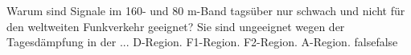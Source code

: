     {Warum sind Signale im 160- und 80 m-Band tagsüber nur schwach und nicht für den weltweiten Funkverkehr geeignet? Sie sind ungeeignet wegen der Tagesdämpfung in der ...}
    {D-Region.}
    {F1-Region.}
    {F2-Region.}
    {A-Region.}
    {false}{false}